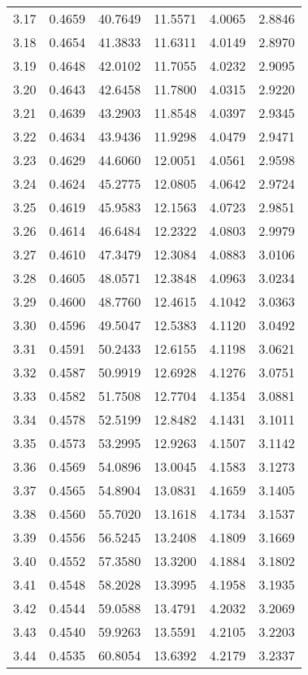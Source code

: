 \documentclass{article}
\begin{document}
\begin{longtable}{cccccc}
3.17 & 0.4659 & 40.7649 & 11.5571 & 4.0065 & 2.8846 \\
3.18 & 0.4654 & 41.3833 & 11.6311 & 4.0149 & 2.8970 \\
3.19 & 0.4648 & 42.0102 & 11.7055 & 4.0232 & 2.9095 \\
3.20 & 0.4643 & 42.6458 & 11.7800 & 4.0315 & 2.9220 \\
3.21 & 0.4639 & 43.2903 & 11.8548 & 4.0397 & 2.9345 \\
3.22 & 0.4634 & 43.9436 & 11.9298 & 4.0479 & 2.9471 \\
3.23 & 0.4629 & 44.6060 & 12.0051 & 4.0561 & 2.9598 \\
3.24 & 0.4624 & 45.2775 & 12.0805 & 4.0642 & 2.9724 \\
3.25 & 0.4619 & 45.9583 & 12.1563 & 4.0723 & 2.9851 \\
3.26 & 0.4614 & 46.6484 & 12.2322 & 4.0803 & 2.9979 \\
3.27 & 0.4610 & 47.3479 & 12.3084 & 4.0883 & 3.0106 \\
3.28 & 0.4605 & 48.0571 & 12.3848 & 4.0963 & 3.0234 \\
3.29 & 0.4600 & 48.7760 & 12.4615 & 4.1042 & 3.0363 \\
3.30 & 0.4596 & 49.5047 & 12.5383 & 4.1120 & 3.0492 \\
3.31 & 0.4591 & 50.2433 & 12.6155 & 4.1198 & 3.0621 \\
3.32 & 0.4587 & 50.9919 & 12.6928 & 4.1276 & 3.0751 \\
3.33 & 0.4582 & 51.7508 & 12.7704 & 4.1354 & 3.0881 \\
3.34 & 0.4578 & 52.5199 & 12.8482 & 4.1431 & 3.1011 \\
3.35 & 0.4573 & 53.2995 & 12.9263 & 4.1507 & 3.1142 \\
3.36 & 0.4569 & 54.0896 & 13.0045 & 4.1583 & 3.1273 \\
3.37 & 0.4565 & 54.8904 & 13.0831 & 4.1659 & 3.1405 \\
3.38 & 0.4560 & 55.7020 & 13.1618 & 4.1734 & 3.1537 \\
3.39 & 0.4556 & 56.5245 & 13.2408 & 4.1809 & 3.1669 \\
3.40 & 0.4552 & 57.3580 & 13.3200 & 4.1884 & 3.1802 \\
3.41 & 0.4548 & 58.2028 & 13.3995 & 4.1958 & 3.1935 \\
3.42 & 0.4544 & 59.0588 & 13.4791 & 4.2032 & 3.2069 \\
3.43 & 0.4540 & 59.9263 & 13.5591 & 4.2105 & 3.2203 \\
3.44 & 0.4535 & 60.8054 & 13.6392 & 4.2179 & 3.2337 \\

\end{longtable}
\end{document}
